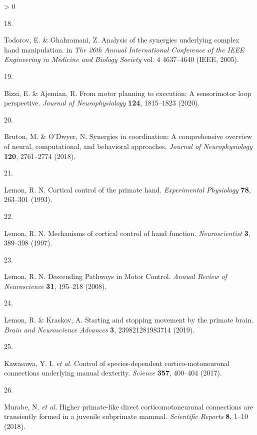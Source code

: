 \documentclass[
  a4paper,
]{article}
\newlength{\cslhangindent}
\newlength{\csllabelwidth}
\newenvironment{CSLReferences}[2] %
 {%
  \setlength{\parindent}{0pt}
  \ifodd #1 \everypar{\setlength{\hangindent}{\cslhangindent}}\ignorespaces\fi
  \ifnum #2 > 0
  \setlength{\parskip}{#2\baselineskip}
  \fi
 }%
 {}
\newcommand{\CSLLeftMargin}[1]{\parbox[t]{\csllabelwidth}{#1}}
\newcommand{\CSLRightInline}[1]{\parbox[t]{\linewidth - \csllabelwidth}{#1}\break}
\begin{document}
\begin{CSLReferences}{0}{0}
\leavevmode\hypertarget{ref-TodorovDimensionality2005}{}%
\CSLLeftMargin{18. }
\CSLRightInline{Todorov, E. \& Ghahramani, Z. Analysis of the synergies
underlying complex hand manipulation. in \emph{The 26th {Annual
International Conference} of the {IEEE Engineering} in {Medicine} and
{Biology Society}} vol. 4 4637--4640 ({IEEE}, 2005).}

\leavevmode\hypertarget{ref-bizziMotorPlanningExecution2020}{}%
\CSLLeftMargin{19. }
\CSLRightInline{Bizzi, E. \& Ajemian, R. From motor planning to
execution: A sensorimotor loop perspective. \emph{Journal of
Neurophysiology} \textbf{124}, 1815--1823 (2020).}

\leavevmode\hypertarget{ref-brutonSynergiesCoordinationComprehensive2018}{}%
\CSLLeftMargin{20. }
\CSLRightInline{Bruton, M. \& O'Dwyer, N. Synergies in coordination: A
comprehensive overview of neural, computational, and behavioral
approaches. \emph{Journal of Neurophysiology} \textbf{120}, 2761--2774
(2018).}

\leavevmode\hypertarget{ref-lemon1993}{}%
\CSLLeftMargin{21. }
\CSLRightInline{Lemon, R. N. Cortical control of the primate hand.
\emph{Experimental Physiology} \textbf{78}, 263--301 (1993).}

\leavevmode\hypertarget{ref-lemon1997}{}%
\CSLLeftMargin{22. }
\CSLRightInline{Lemon, R. N. Mechanisms of cortical control of hand
function. \emph{Neuroscientist} \textbf{3}, 389--398 (1997).}

\leavevmode\hypertarget{ref-lemon2008}{}%
\CSLLeftMargin{23. }
\CSLRightInline{Lemon, R. N. Descending {Pathways} in {Motor Control}.
\emph{Annual Review of Neuroscience} \textbf{31}, 195--218 (2008).}

\leavevmode\hypertarget{ref-lemonStartingStoppingMovement2019}{}%
\CSLLeftMargin{24. }
\CSLRightInline{Lemon, R. \& Kraskov, A. Starting and stopping movement
by the primate brain. \emph{Brain and Neuroscience Advances} \textbf{3},
239821281983714 (2019).}

\leavevmode\hypertarget{ref-kawasawa2017}{}%
\CSLLeftMargin{25. }
\CSLRightInline{Kawasawa, Y. I. \emph{et al.} Control of
species-dependent cortico-motoneuronal connections underlying manual
dexterity. \emph{Science} \textbf{357}, 400--404 (2017).}

\leavevmode\hypertarget{ref-murabe2018}{}%
\CSLLeftMargin{26. }
\CSLRightInline{Murabe, N. \emph{et al.} Higher primate-like direct
corticomotoneuronal connections are transiently formed in a juvenile
subprimate mammal. \emph{Scientific Reports} \textbf{8}, 1--10 (2018).}


\end{CSLReferences}
\end{document}
